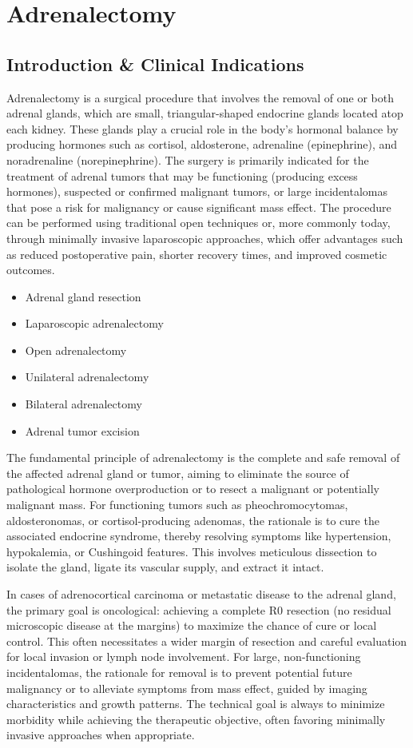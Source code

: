 \chapter{Adrenalectomy}

\section*{Introduction \& Clinical Indications}
Adrenalectomy is a surgical procedure that involves the removal of one or both adrenal glands, which are small, triangular-shaped endocrine glands located atop each kidney. These glands play a crucial role in the body's hormonal balance by producing hormones such as cortisol, aldosterone, adrenaline (epinephrine), and noradrenaline (norepinephrine). The surgery is primarily indicated for the treatment of adrenal tumors that may be functioning (producing excess hormones), suspected or confirmed malignant tumors, or large incidentalomas that pose a risk for malignancy or cause significant mass effect. The procedure can be performed using traditional open techniques or, more commonly today, through minimally invasive laparoscopic approaches, which offer advantages such as reduced postoperative pain, shorter recovery times, and improved cosmetic outcomes.

\begin{itemize}
  \item Adrenal gland resection
  \item Laparoscopic adrenalectomy
  \item Open adrenalectomy
  \item Unilateral adrenalectomy
  \item Bilateral adrenalectomy
  \item Adrenal tumor excision
\end{itemize}

The fundamental principle of adrenalectomy is the complete and safe removal of the affected adrenal gland or tumor, aiming to eliminate the source of pathological hormone overproduction or to resect a malignant or potentially malignant mass. For functioning tumors such as pheochromocytomas, aldosteronomas, or cortisol-producing adenomas, the rationale is to cure the associated endocrine syndrome, thereby resolving symptoms like hypertension, hypokalemia, or Cushingoid features. This involves meticulous dissection to isolate the gland, ligate its vascular supply, and extract it intact.

In cases of adrenocortical carcinoma or metastatic disease to the adrenal gland, the primary goal is oncological: achieving a complete R0 resection (no residual microscopic disease at the margins) to maximize the chance of cure or local control. This often necessitates a wider margin of resection and careful evaluation for local invasion or lymph node involvement. For large, non-functioning incidentalomas, the rationale for removal is to prevent potential future malignancy or to alleviate symptoms from mass effect, guided by imaging characteristics and growth patterns. The technical goal is always to minimize morbidity while achieving the therapeutic objective, often favoring minimally invasive approaches when appropriate.


